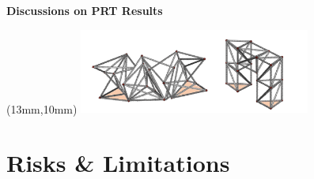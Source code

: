 \documentclass[11pt,aspectratio=169]{beamer}
\begin{document}
\begin{frame}[fragile]{\textbf{Discussions on PRT Results}}
        \begin{textblock*}{5cm}(13mm,10mm) %
        \includegraphics[height=28mm]{elements/[19-2]-PRT.png}
        \end{textblock*}

\end{frame}


\section{Risks \& Limitations}
\end{document}
